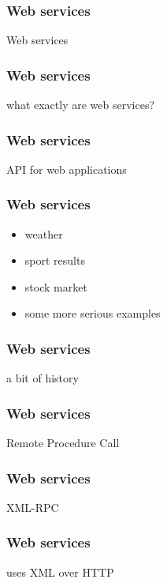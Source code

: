 \begin{frame}
  \frametitle{Web services}
  \begin{center}
    Web services
  \end{center}
\end{frame}

\begin{frame}
  \frametitle{Web services}
  \begin{center}
    what exactly are web services?
  \end{center}
\end{frame}

\begin{frame}
  \frametitle{Web services}
  \begin{center}
    API for web applications
  \end{center}
\end{frame}

\begin{frame}
  \frametitle{Web services}
  \begin{itemize}
  \item weather
  \item sport results
  \item stock market
  \item \alert{some more serious examples}
  \end{itemize}
\end{frame}

\begin{frame}
  \frametitle{Web services}
  \begin{center}
    a bit of history
  \end{center}
\end{frame}

\begin{frame}
  \frametitle{Web services}
  \begin{center}
    Remote Procedure Call
  \end{center}
\end{frame}

\begin{frame}
  \frametitle{Web services}
  \begin{center}
    XML-RPC
  \end{center}
\end{frame}

\begin{frame}
  \frametitle{Web services}
  \begin{center}
    uses XML over HTTP
  \end{center}
\end{frame}


